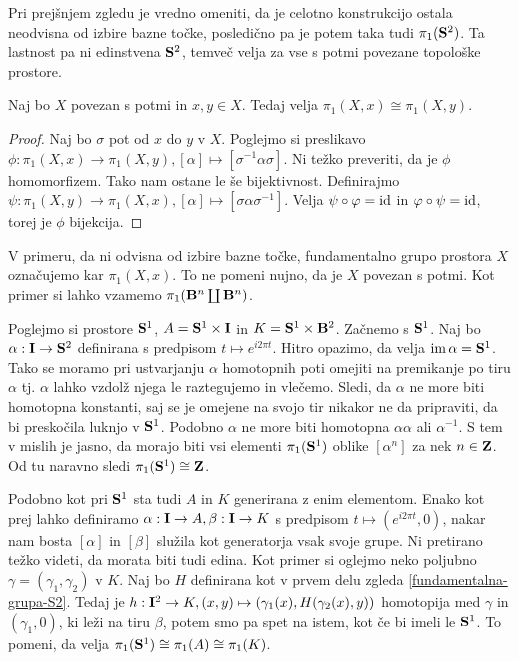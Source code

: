 \documentclass[11pt, a4paper]{article}
\begin{document}
Pri prejšnjem zgledu je vredno omeniti, da je celotno konstrukcijo ostala neodvisna od izbire bazne točke, posledično pa je potem taka tudi $\pi_1(\S^2)$. Ta lastnost pa ni edinstvena $\S^2$, temveč velja za vse s potmi povezane topološke prostore.


\begin{trditev}
    Naj bo $X$ povezan s potmi in $x, y \in X$. Tedaj velja $\pi_1(X, x) \cong \pi_1(X, y)$.
\end{trditev}


\begin{proof}
    Naj bo $\sigma$ pot od $x$ do $y$ v $X$. Poglejmo si preslikavo $\phi : \pi_1(X, x) \to \pi_1(X, y), [\alpha] \mapsto [\sigma^{-1}\alpha\sigma]$. Ni težko preveriti, da je $\phi$ homomorfizem. Tako nam ostane le še bijektivnost. Definirajmo $\psi : \pi_1(X, y) \to \pi_1(X, x), [\alpha] \mapsto [\sigma\alpha\sigma^{-1}]$. Velja $\psi \circ \phi = \id$ in $\phi \circ \psi = \id$, torej je $\phi$ bijekcija.
\end{proof}


\begin{opomba}
    V primeru, da ni odvisna od izbire bazne točke, fundamentalno grupo prostora $X$ označujemo kar $\pi_1(X, x)$. To ne pomeni nujno, da je $X$ povezan s potmi. Kot primer si lahko vzamemo $\pi_1(\B^n \coprod \B^n)$.
\end{opomba}


\begin{zgled}
    Poglejmo si prostore $\S^1$, $A = \S^1 \times \I$ in $K = \S^1 \times \B^2$. Začnemo s $\S^1$. Naj bo $\alpha : \I \to \S^2$ definirana s predpisom $t \mapsto e^{i2\pi t}$. Hitro opazimo, da velja $\im\alpha = \S^1$. Tako se moramo pri ustvarjanju $\alpha$ homotopnih poti omejiti na premikanje po tiru $\alpha$ tj. $\alpha$ lahko vzdolž njega le raztegujemo in vlečemo. Sledi, da $\alpha$ ne more biti homotopna konstanti, saj se je omejene na svojo tir nikakor ne da pripraviti, da bi preskočila luknjo v $\S^1$. Podobno $\alpha$ ne more biti homotopna $\alpha\alpha$ ali $\alpha^{-1}$. S tem v mislih je jasno, da morajo biti vsi elementi $\pi_1(\S^1)$ oblike $[\alpha^n]$ za nek $n \in \Z$. Od tu naravno sledi $\pi_1(\S^1) \cong \Z$.

    Podobno kot pri $\S^1$ sta tudi $A$ in $K$ generirana z enim elementom. Enako kot prej lahko definiramo $\alpha : \I \to A, \beta : \I \to K$ s predpisom $t \mapsto (e^{i2\pi t}, 0)$, nakar nam bosta $[\alpha]$ in $[\beta]$ služila kot generatorja vsak svoje grupe. Ni pretirano težko videti, da morata biti tudi edina. Kot primer si oglejmo neko poljubno $\gamma = (\gamma_1, \gamma_2)$ v $K$. Naj bo $H$ definirana kot v prvem delu zgleda \ref{fundamentalna-grupa-S2}. Tedaj je $h : \I^2 \to K, (x, y) \mapsto (\gamma_1(x), H(\gamma_2(x), y))$ homotopija med $\gamma$ in $(\gamma_1, 0)$, ki leži na tiru $\beta$, potem smo pa spet na istem, kot če bi imeli le $\S^1$. To pomeni, da velja $\pi_1(\S^1) \cong \pi_1(A) \cong \pi_1(K)$.
    \label{fundamentalna-grupa-S1}
\end{zgled}
\end{document}
